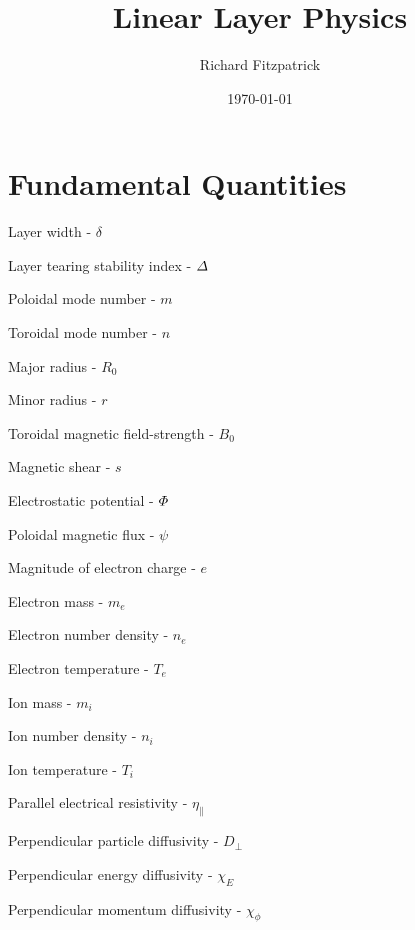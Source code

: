 \documentclass[12pt]{article}
\title{\bf Linear Layer Physics}
\date{\today}
\author{Richard Fitzpatrick}
\begin{document}
\maketitle

\section{Fundamental Quantities}
\begin{description}
\item Layer width - $\delta$
\item Layer tearing stability index - ${\mit\Delta}$
\item Poloidal mode number - $m$
\item Toroidal mode number - $n$
\item Major radius - $R_0$
\item Minor radius - $r$
\item Toroidal magnetic field-strength - $B_0$
\item Magnetic shear - $s$
\item Electrostatic potential - ${\mit\Phi}$
\item Poloidal magnetic flux - $\psi$
\item Magnitude of electron charge - $e$
\item Electron mass - $m_e$
\item Electron number density - $n_e$
\item Electron temperature - $T_e$
\item Ion mass - $m_i$
\item Ion number density - $n_i$
\item Ion temperature - $T_i$
\item Parallel electrical resistivity - $\eta_\parallel$ 
\item Perpendicular particle diffusivity - $D_\perp$
\item Perpendicular energy diffusivity - $\chi_E$
\item Perpendicular momentum diffusivity - $\chi_\phi$ 
\end{description}
\end{document}
